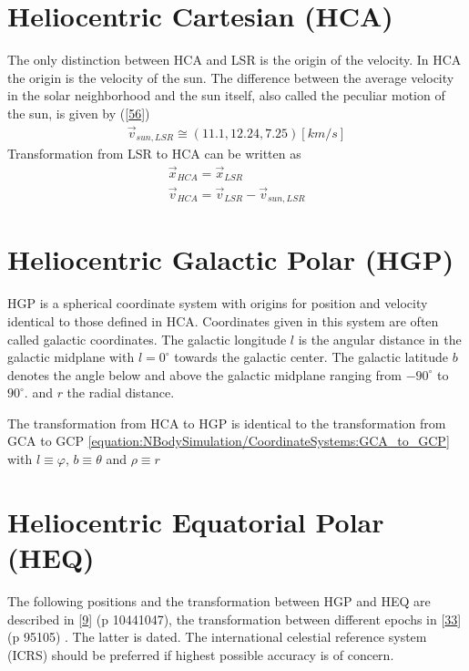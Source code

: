 \documentclass[letterpaper,10pt,english]{sphinxmanual}
\begin{document}
\section{Heliocentric Cartesian (HCA)}
\label{\detokenize{NBodySimulation/CoordinateSystems:heliocentric-cartesian-hca}}
\sphinxAtStartPar
The only distinction between HCA and LSR is the origin of the velocity. In HCA the origin is the velocity of the sun.
The difference between the average velocity in the solar neighborhood and the sun itself, also called the peculiar motion of the sun,
is given by ({[}\hyperlink{cite.NBodySimulation/Appendix:id30}{56}{]})
\begin{equation*}
\begin{split}\vec{v}_{sun,LSR} \cong  (11.1, 12.24, 7.25)[km/s]\end{split}
\end{equation*}
\sphinxAtStartPar
Transformation from LSR to HCA can be written as
\begin{equation*}
\begin{split}\vec{x}_{HCA} = \vec{x}_{LSR} \\
\vec{v}_{HCA} = \vec{v}_{LSR} - \vec{v}_{sun,LSR}\end{split}
\end{equation*}

\section{Heliocentric Galactic Polar (HGP)}
\label{\detokenize{NBodySimulation/CoordinateSystems:heliocentric-galactic-polar-hgp}}
\sphinxAtStartPar
HGP is a spherical coordinate system with origins for position and velocity identical to those defined in HCA.
Coordinates given in this system are often called galactic coordinates.
The galactic longitude \(l\) is the angular distance in the galactic midplane with \(l=0^{\circ}\) towards the galactic center.
The galactic latitude \(b\) denotes the angle below and above the galactic midplane ranging from \(-90^{\circ}\) to \(90^{\circ}\).
and \(r\) the radial distance.

\sphinxAtStartPar
The transformation from HCA to HGP is identical to the transformation from GCA to GCP \eqref{equation:NBodySimulation/CoordinateSystems:GCA_to_GCP} with \(l \equiv \varphi\), \(b \equiv \theta\) and \(\rho \equiv r\)


\section{Heliocentric Equatorial Polar (HEQ)}
\label{\detokenize{NBodySimulation/CoordinateSystems:heliocentric-equatorial-polar-heq}}
\sphinxAtStartPar
The following positions and the transformation between HGP and HEQ are described in {[}\hyperlink{cite.NBodySimulation/Appendix:id32}{9}{]} (p 1044\sphinxhyphen{}1047),
the transformation between different epochs in {[}\hyperlink{cite.NBodySimulation/Appendix:id31}{33}{]} (p 95\sphinxhyphen{}105) . The latter is dated.
The international celestial reference system (ICRS) should be preferred if highest possible accuracy is of concern.
\end{document}
